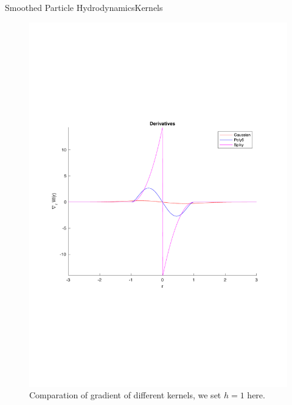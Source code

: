 \documentclass{beamer}
\begin{document}
\begin{frame}{Smoothed Particle Hydrodynamics}{Kernels}
\begin{figure}
        \centering
        \includegraphics[scale = 0.3]{../report/Figures/kenels_de}
        \caption{Comparation of gradient of different kernels, we set $h = 1$ here. }
        \label{fg:gradient}
\end{figure}
\end{frame}

\begin{frame}
\end{frame}
\end{document}
